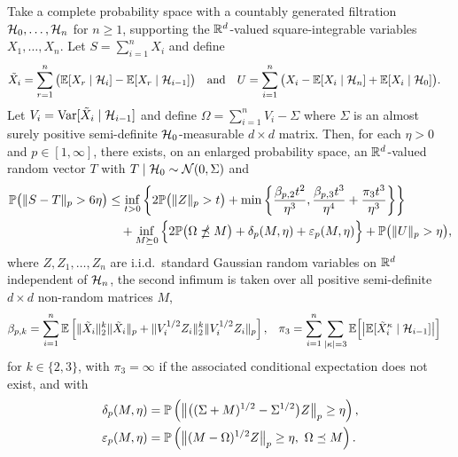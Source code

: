 \begin{theorem}
  \label{thm:yurinskii_sa_dependent}

  Take a complete probability space with a countably generated filtration
  $\cH_0, \ldots, \cH_n$ for $n \geq 1$, supporting the $\R^d$-valued
  square-integrable variables $X_1, \ldots, X_n$.
  Let $S = \sum_{i=1}^n X_i$ and define
  \begin{align*}
    \tilde X_i
    &= \sum_{r=1}^n \big(\E[X_{r} \mid \cH_{i}] - \E[X_{r} \mid \cH_{i-1}]\big)
    & &\text{and}
    &U &= \sum_{i=1}^{n} \big( X_i - \E[ X_i \mid \cH_n]
    + \E[ X_i \mid \cH_0 ] \big).
  \end{align*}
  Let $V_i = \Var[\tilde X_i \mid \cH_{i-1}]$ and
  define $\Omega = \sum_{i=1}^n V_i - \Sigma$
  where $\Sigma$ is an almost surely positive semi-definite $\cH_0$-measurable
  $d \times d$ matrix. Then, for each $\eta > 0$ and $p \in [1,\infty]$,
  there exists, on an enlarged probability space, an $\R^d$-valued random
  vector $T$ with $T \mid \cH_0 \sim \cN(0, \Sigma)$ and
  \begin{align}
    \label{eq:yurinskii_sa_dependent}
    \P\big(\|S-T\|_p > 6\eta\big)
    &\leq
    \inf_{t>0}
    \left\{
      2 \P\big( \|Z\|_p > t \big)
      + \min\left\{
        \frac{\beta_{p,2} t^2}{\eta^3},
        \frac{\beta_{p,3} t^3}{\eta^4}
        + \frac{\pi_3 t^3}{\eta^3}
      \right\}
    \right\} \nonumber \\
    &\quad+
    \inf_{M \succeq 0}
    \Big\{ 2 \P\big(\Omega \npreceq M\big) + \delta_p(M,\eta)
    + \varepsilon_p(M, \eta)\Big\}
    +\P\big(\|U\|_p>\eta\big),
  \end{align}
  where $Z, Z_1,\dots ,Z_n$ are i.i.d.\ standard Gaussian random variables on
  $\R^d$ independent of $\cH_n$, the second infimum is taken over all positive
  semi-definite $d \times d$ non-random matrices $M$,
  \begin{align*}
    \beta_{p,k}
    &=
    \sum_{i=1}^n \E\left[\| \tilde X_i \|^k_2 \| \tilde X_i \|_p
    + \|V_i^{1/2} Z_i \|^k_2 \|V_i^{1/2} Z_i \|_p \right],
    &\pi_3
    &=
    \sum_{i=1}^{n}
    \sum_{|\kappa| = 3}
    \E \Big[ \big|
      \E [ \tilde X_i^\kappa \mid \cH_{i-1} ]
    \big| \Big]
  \end{align*}
  for $k \in \{2, 3\}$, with $\pi_3 = \infty$ if the associated
  conditional expectation does not exist, and with
  \begin{align*}
    \delta_p(M,\eta)
    &=
    \P\left(
      \big\|\big((\Sigma +M)^{1/2}- \Sigma^{1/2}\big) Z\big\|_p
      \geq \eta
    \right), \\
    \varepsilon_p(M, \eta)
    &=
    \P\left(\big\| (M - \Omega)^{1/2} Z \big\|_p\geq \eta, \
    \Omega \preceq M\right).
  \end{align*}
\end{theorem}

